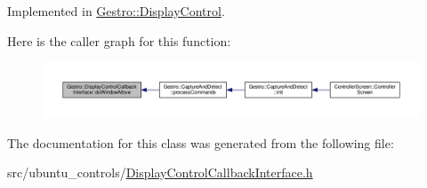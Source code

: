 Implemented in \hyperlink{class_gestro_1_1_display_control_aca4208c53cac28e164e7949effdc04cd}{Gestro\+::\+Display\+Control}.

Here is the caller graph for this function\+:
\nopagebreak
\begin{figure}[H]
\begin{center}
\leavevmode
\includegraphics[width=350pt]{class_gestro_1_1_display_control_callback_interface_a5232eef7102a1db6d227189132c92ebd_icgraph}
\end{center}
\end{figure}


The documentation for this class was generated from the following file\+:\begin{DoxyCompactItemize}
\item 
src/ubuntu\+\_\+controls/\hyperlink{_display_control_callback_interface_8h}{Display\+Control\+Callback\+Interface.\+h}\end{DoxyCompactItemize}

